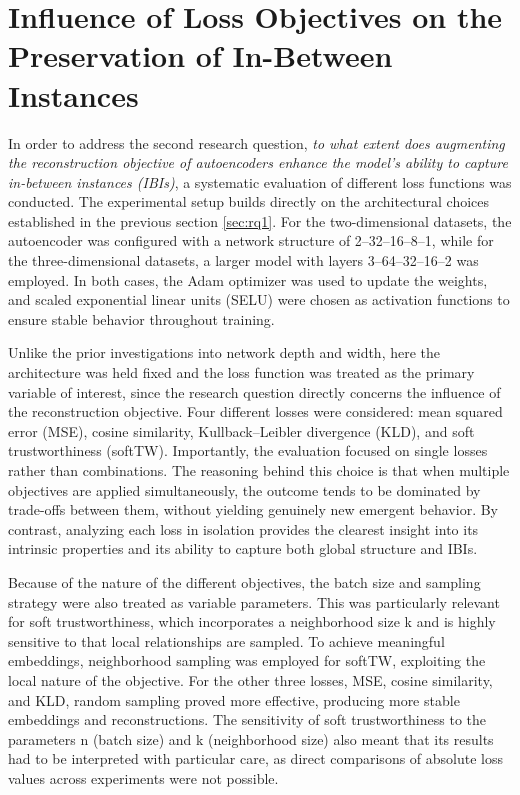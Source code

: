 \section{Influence of Loss Objectives on the Preservation of In-Between Instances} \label{sec:rq2}

In order to address the second research question, \textit{to what extent does augmenting the reconstruction objective of autoencoders enhance the model’s ability to capture in-between instances (IBIs)}, a systematic evaluation of different loss functions was conducted. The experimental setup builds directly on the architectural choices established in the previous section \ref{sec:rq1}. For the two-dimensional datasets, the autoencoder was configured with a network structure of 2–32–16–8–1, while for the three-dimensional datasets, a larger model with layers 3–64–32–16–2 was employed. In both cases, the Adam optimizer was used to update the weights, and scaled exponential linear units (SELU) were chosen as activation functions to ensure stable behavior throughout training.

Unlike the prior investigations into network depth and width, here the architecture was held fixed and the loss function was treated as the primary variable of interest, since the research question directly concerns the influence of the reconstruction objective. Four different losses were considered: mean squared error (MSE), cosine similarity, Kullback–Leibler divergence (KLD), and soft trustworthiness (softTW). Importantly, the evaluation focused on single losses rather than combinations. The reasoning behind this choice is that when multiple objectives are applied simultaneously, the outcome tends to be dominated by trade-offs between them, without yielding genuinely new emergent behavior. By contrast, analyzing each loss in isolation provides the clearest insight into its intrinsic properties and its ability to capture both global structure and IBIs.

Because of the nature of the different objectives, the batch size and sampling strategy were also treated as variable parameters. This was particularly relevant for soft trustworthiness, which incorporates a neighborhood size k and is highly sensitive to that local relationships are sampled. To achieve meaningful embeddings, neighborhood sampling was employed for softTW, exploiting the local nature of the objective. For the other three losses, MSE, cosine similarity, and KLD, random sampling proved more effective, producing more stable embeddings and reconstructions. The sensitivity of soft trustworthiness to the parameters n (batch size) and k (neighborhood size) also meant that its results had to be interpreted with particular care, as direct comparisons of absolute loss values across experiments were not possible.

